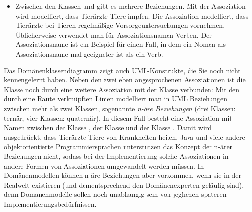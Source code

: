 \begin{itemize}
	\item Zwischen den Klassen  und  gibt es mehrere Beziehungen. Mit der Assoziation  wird modelliert, dass Tierärzte Tiere impfen. Die Assoziation  modelliert, dass Tierärzte bei Tieren regelmäßige Vorsorgeuntersuchungen vornehmen. Üblicherweise verwendet man für Assoziationsnamen Verben. Der Assoziationsname  ist ein Beispiel für einen Fall, in dem ein Nomen als Assoziationsname mal geeigneter ist als ein Verb.
\end{itemize}

Das Domänenklassendiagramm zeigt auch UML-Konstrukte, die Sie noch nicht kennengelernt haben. Neben den zwei eben angesprochenen Assoziationen ist die Klasse  noch durch eine weitere Assoziation mit der Klasse  verbunden: Mit den durch eine Raute verknüpften Linien modelliert man in UML Beziehungen zwischen mehr als zwei Klassen, sogenannte \textit{n-äre Beziehungen}
(\zb drei Klassen: ternär, vier Klassen: quaternär). In diesem Fall besteht eine Assoziation mit Namen  zwischen der Klasse , der Klasse  und der Klasse . Damit wird ausgedrückt, dass Tierärzte Tiere von Krankheiten heilen. Java und viele andere objektorientierte Programmiersprachen unterstützen das Konzept der n-ären Beziehungen nicht, sodass bei der Implementierung solche Assoziationen in andere Formen von Assoziationen umgewandelt werden müssen. In Domänenmodellen können n-äre Beziehungen aber vorkommen, wenn sie in der Realwelt existieren (und dementsprechend den Domänenexperten geläufig sind), denn Domänenmodelle sollen noch unabhängig sein von jeglichen späteren Implementierungsbedürfnissen.

